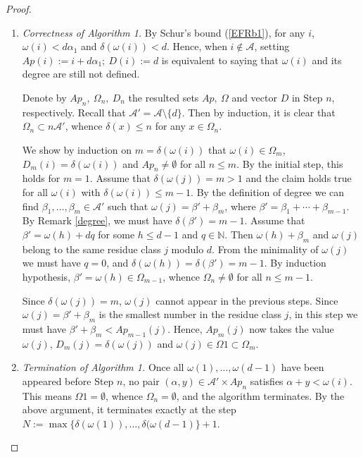 \documentclass[11pt]{article}
\def\Acal{{\mathcal A}}
\def\Nset{{\mathbb N}}
\theoremstyle{remark}
\theoremstyle{definition}
\begin{document}
\begin{proof} 
\begin{enumerate}[\((a)\)]
    \item \textit{Correctness of Algorithm 1.} By Schur's bound (\ref{EFRb1}), for any $i$, $\omega(i) <  d\alpha_1$ and $\delta(\omega(i)) < d$. Hence,  when $i\not\in \Acal$, setting $Ap(i) := i +d\alpha_1;\ D(i) := d$ is equivalent to saying that $\omega(i)$ and its degree  are still not defined.

Denote by $Ap_n,\ \Omega_n, \ D_n$ the resulted sets $Ap,\ \Omega$ and vector $D$ in Step $n$, respectively. Recall that $\Acal' = \Acal \setminus \{d\}$. Then by induction, it is clear that $\Omega_n \subset n\Acal'$, whence $\delta(x) \leq n$ for any $x\in \Omega_n$.

We show by induction on $ m = \delta(\omega(i))$ that $\omega(i) \in \Omega_m$, $D_m(i) = \delta(\omega(i))$  and  $Ap_n \neq \emptyset$ for all $n\leq m$. By the initial step, this holds for $m=1$. Assume that $\delta(\omega(j)) = m >1$ and the claim holds true for all $\omega(i)$ with $\delta(\omega(i)) \leq m-1$. By the definition of degree we can find $\beta_1,\ldots,\beta_m \in \Acal'$ such that
$\omega(j) = \beta'  + \beta_m$, where $\beta' = \beta_1 + \cdots + \beta_{m-1}$. By Remark \ref{degree}, we must have $\delta(\beta') = m-1$. Assume that $\beta' = \omega(h) + dq$ for some $h\leq d-1$ and $q\in \Nset$. Then $\omega(h) + \beta_m$ and $\omega(j)$ belong to the same residue class $j$ modulo $d$. From the minimality of $\omega(j)$ we must have $q=0$, and $\delta(\omega(h)) = \delta(\beta') = m-1$. By induction hypothesis, $\beta' = \omega(h) \in \Omega_{m-1}$, whence  $\Omega_n \neq \emptyset$ for all $n\leq m-1$.

Since $\delta(\omega(j)) = m$, $\omega(j)$ cannot appear in the previous steps. Since $\omega(j) = \beta'+\beta_m$ is the smallest number in the residue class $j$, in this step we must have $\beta'+\beta_m < Ap_{m-1}(j)$. Hence,  $Ap_m(j)$ now takes the value $\omega(j)$, $D_m(j) = \delta(\omega(j))$  and $\omega(j) \in \Omega1 \subset \Omega_m$.
\item \textit{Termination of Algorithm 1.} Once all $\omega(1),\ldots,\omega(d-1)$ have been appeared before Step $n$,  no pair $(\alpha, y) \in \Acal' \times Ap_n$ satisfies $\alpha + y < \omega(i)$. This means $\Omega1 = \emptyset$, whence $\Omega_n = \emptyset$, and the algorithm terminates. By the above argument, it terminates exactly at the step $N := \max\{ \delta(\omega(1)),\ldots,\delta(\omega(d-1)\} + 1$.


\end{enumerate}
\end{proof}
\end{document}
